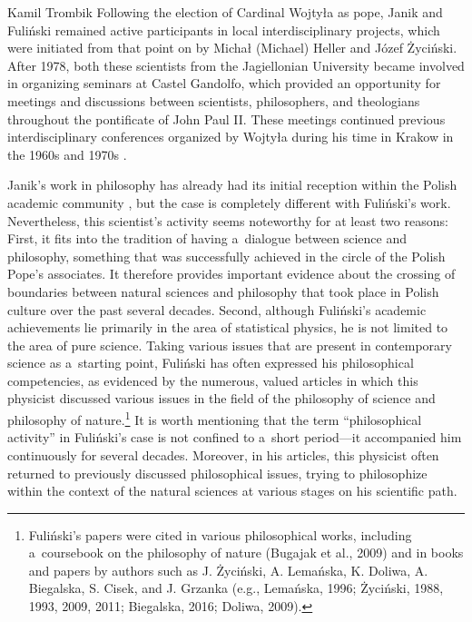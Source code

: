 \begin{artengenv}{Kamil Trombik}
Following the election of Cardinal Wojtyła as pope, Janik and Fuliński remained active participants in local interdisciplinary projects, which were initiated from that point on by Michał (Michael) Heller and Józef Życiński. After 1978, both these scientists from the Jagiellonian University became involved in organizing seminars at Castel Gandolfo, which provided an opportunity for meetings and discussions between scientists, philosophers, and theologians throughout the pontificate of John Paul II. These meetings continued previous interdisciplinary conferences organized by Wojtyła during his time in Krakow in the 1960s and 1970s 
\parencite[][]{trombik_stworzyc_2022}.%




Janik's work in philosophy has already had its initial reception within the Polish academic community 
\parencite[][]{fulinski_profesor_2015}, %
 but the case is completely different with Fuliński's work. Nevertheless, this scientist's activity seems noteworthy for at least two reasons: First, it fits into the tradition of having a~dialogue between science and philosophy, something that was successfully achieved in the circle of the Polish Pope's associates. It therefore provides important evidence about the crossing of boundaries between natural sciences and philosophy that took place in Polish culture over the past several decades. Second, although Fuliński's academic achievements lie primarily in the area of statistical physics, he is not limited to the area of pure science. Taking various issues that are present in contemporary science as a~starting point, Fuliński has often expressed his philosophical competencies, as evidenced by the numerous, valued articles in which this physicist discussed various issues in the field of the philosophy of science and philosophy of nature.\footnote{Fuliński's papers were cited in various philosophical works, including a~coursebook on the philosophy of nature (Bugajak et al., 2009) and in books and papers by authors such as J. Życiński, A. Lemańska, K. Doliwa, A. Biegalska, S. Cisek, and J. Grzanka (e.g., Lemańska, 1996; Życiński, 1988, 1993, 2009, 2011; Biegalska, 2016; Doliwa, 2009).} It is worth mentioning that the term ``philosophical activity'' in Fuliński's case is not confined to a~short period---it accompanied him continuously for several decades. Moreover, in his articles, this physicist often returned to previously discussed philosophical issues, trying to philosophize within the context of the natural sciences at various stages on his scientific path.




\end{artengenv}
